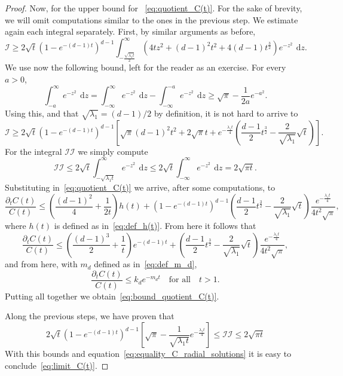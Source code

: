 \documentclass[10pt,a4paper]{amsart}
\def\d{\,\mathrm{d}}
\begin{document}
\begin{proof}
	Now, for the upper bound  for ~\eqref{eq:quotient_C(t)}. For the sake of brevity, we will omit computations similar to the ones in the previous step. We estimate again each integral separately. First, by similar arguments as before,
	\[
	\mathcal{I}\geq 2\sqrt{t}\left(1-e^{-(d-1)t}\right)^{d-1}\int_{-\frac{\sqrt{\lambda_1 t}}{2}}^\infty \left(4tz^2 +(d-1)^2t^2  +4(d-1)t^\frac{3}{2}  \right) e^{-z^2}\ \d z.
	\]
	We use now the following bound, left for the reader as an exercise. For every $a>0$,
	\[
	\int_{-a}^\infty e^{-z^2}\ \d z = \int_{-\infty}^\infty e^{-z^2}\ \d z - \int_{-\infty}^{-a} e^{-z^2}\ \d z\geq \sqrt{\pi} - \frac{1}{2a}e^{-a^2}.
	\]
	Using this, and that $\sqrt{\lambda_1}=(d-1)/2$ by definition, it is not hard to arrive to
	\[
	\mathcal{I}\geq 2\sqrt{t}\left(1-e^{-(d-1)t}  \right)^{d-1}\left[\sqrt{\pi}(d-1)^2t^2+2\sqrt{\pi}t + e^{-\frac{\lambda_1 t}{4}}\left(   \frac{d-1}{2}t^\frac{3}{2} - \frac{2}{\sqrt{\lambda_1}}\sqrt{t}  \right)  \right].
	\]
	For the integral $\mathcal{II}$ we simply compute
	\[
	\mathcal{II}\leq 2\sqrt{t}\int_{-\sqrt{\lambda_1 t}}^\infty e^{-z^2}\ \d z\leq 2\sqrt{t}\int_{-\infty}^\infty e^{-z^2}\ \d z = 2\sqrt{\pi t}.
	\]
	Substituting in~\eqref{eq:quotient_C(t)} we arrive, after some computations, to
	\[
	\frac{\partial_t C(t)}{C(t)}\leq \left( \frac{(d-1)^2}{4} + \frac{1}{2t} \right)h(t) + \left(1-e^{-(d-1)t}  \right)^{d-1} \left( \frac{d-1}{2}t^\frac{3}{2} - \frac{2}{\sqrt{\lambda_1}}\sqrt{t} \right) \frac{e^{-\frac{\lambda_1 t}{4}}}{4t^2\sqrt{\pi}},
	\]
	where $h(t)$ is defined as in~\eqref{eq:def_h(t)}. From here it follows that
	\[
	\frac{\partial_t C(t)}{C(t)}\leq \left( \frac{(d-1)^3}{2} + \frac{1}{t} \right)e^{-(d-1)t} + \left( \frac{d-1}{2}t^\frac{3}{2} - \frac{2}{\sqrt{\lambda_1}}\sqrt{t} \right) \frac{e^{-\frac{\lambda_1 t}{4}}}{4t^2\sqrt{\pi}},
	\]
	and from here, with $m_d$ defined as in~\eqref{eq:def_m_d},
	\[
	\frac{\partial_t C(t)}{C(t)}\leq k_d e^{-m_d t}\quad\text{for all}\quad t>1.
	\]
	Putting all together we obtain~\eqref{eq:bound_quotient_C(t)}.
	
	Along the previous steps, we have proven that
	\[
	2\sqrt{t} \left(1- e^{-(d-1)t}\right)^{d-1}\left[\sqrt{\pi} - \frac{1}{\sqrt{\lambda_1 t}}e^{-{\frac{\lambda_1 t}{4}}} \right]\leq  \mathcal{II}\leq  2\sqrt{\pi t}
	\]
	With this bounds and equation~\eqref{eq:equality_C_radial_solutions} it is easy to conclude~\eqref{eq:limit_C(t)}.
\end{proof}
\end{document}
